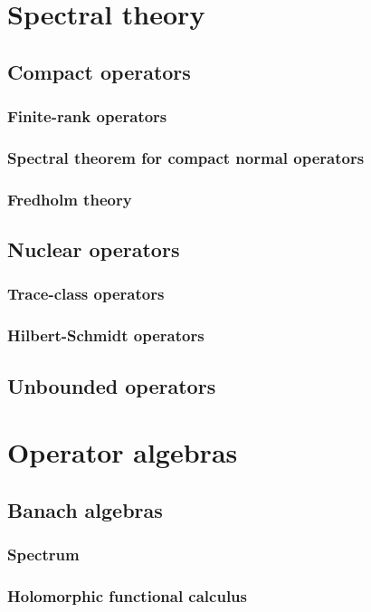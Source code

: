 \documentclass{../note}
\begin{document}
\part{Spectral theory}
\chapter{Compact operators}
\section{Finite-rank operators}
\section{Spectral theorem for compact normal operators}
\section{Fredholm theory}

\chapter{Nuclear operators}
\section{Trace-class operators}
\section{Hilbert-Schmidt operators}

\chapter{Unbounded operators}







\part{Operator algebras}
\chapter{Banach algebras}
\section{Spectrum}
\section{Holomorphic functional calculus}
\end{document}
